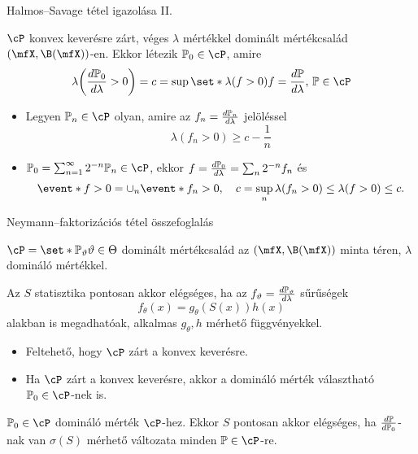 \documentclass[aspectratio=169,notheorems,9pt,\option]{beamer}
\begin{document}
\begin{frame}{Halmos--Savage tétel igazolása II.}
\begin{lemma}
  $\cP$ konvex keverésre zárt, véges $\lambda$ mértékkel dominált mértékcsalád 
  $(\mfX,\B(\mfX))$-en. Ekkor létezik $\P[0]\in\cP$, amire
  \begin{displaymath}
    \lambda\zjel*{\frac{d\P[0]}{d\lambda}>0}=c=\sup\set*{\lambda(f>0)}{f=\frac{d\P}{d\lambda},\,\P\in\cP}
  \end{displaymath}
\end{lemma}
\begin{itemize}
  \item Legyen $\P[n]\in\cP$ olyan, amire az $f_n=\frac{d\P[n]}{d\lambda}$ jelöléssel
  \begin{displaymath}
    \lambda(f_n>0)\geq c-\frac1n
  \end{displaymath}
  \item $\P[0]=\sum_{n=1}^{\infty} 2^{-n} \P[n]\in\cP$, ekkor 
  $f=\frac{d\P[0]}{d\lambda}=\sum_n 2^{-n}f_n$ és 
  \begin{displaymath}
    \event*{f>0}=\cup_n\event*{f_n>0},\quad c = \sup_n\lambda(f_n>0)\leq \lambda(f>0)\leq c.
  \end{displaymath}
\end{itemize}
\end{frame}

\begin{frame}[<*>]{Neymann--faktorizációs tétel összefoglalás}
\begin{theorem}
  $\cP=\set*{\P[\theta]}{\theta\in\Theta}$ dominált mértékcsalád az 
  $(\mfX,\B(\mfX))$ minta téren, $\lambda$ domináló mértékkel. 
  
  Az $S$  statisztika pontosan akkor elégséges, ha az 
  $f_\theta=\frac{d\P[\theta]}{d\lambda}$ 
  sűrűségek
  \begin{displaymath}
    f_{\theta}(x)=g_{\theta}(S(x))h(x)  %
  \end{displaymath}
  alakban is megadhatóak, 
  alkalmas $g_\theta,h$ mérhető függvényekkel.
\end{theorem}
\begin{itemize}
  \item Feltehető, hogy $\cP$ zárt a konvex keverésre.
  \item Ha $\cP$ zárt a konvex keverésre, akkor a domináló mérték választható $\P[0]\in\cP$-nek is.
\end{itemize}
\begin{lemma}
  $\P[0]\in\cP$ domináló mérték $\cP$-hez. Ekkor $S$ pontosan akkor elégséges, ha $\frac{d\P}{d\P[0]}$-nak 
  van $\sigma(S)$ mérhető változata minden $\P\in\cP$-re.
\end{lemma}
\end{frame}
\end{document}
